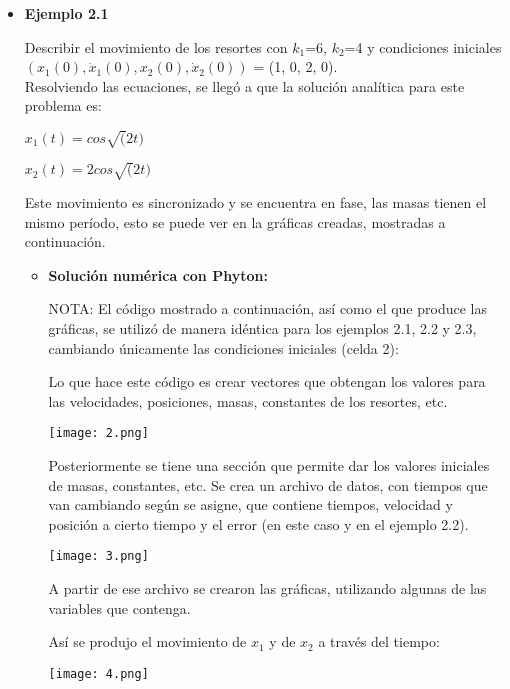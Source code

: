 \documentclass[12pt]{article}
\begin{document}
\begin{itemize}
\item \textbf{Ejemplo 2.1}

Describir el movimiento de los resortes con $k_1$=6, $k_2$=4 y condiciones iniciales $(x_1(0), \dot x_1(0), x_2(0), \dot x_2(0))$ = (1, 0, 2, 0).\\

Resolviendo las ecuaciones, se llegó a que la solución analítica para este problema es: \\

\centerline{$x_1(t) = cos\sqrt (2t)$}
\centerline{$x_2(t) = 2cos\sqrt (2t)$}

Este movimiento es sincronizado y se encuentra en fase, las masas tienen el mismo período, esto se puede ver en la gráficas creadas, mostradas a continuación. 

\begin{itemize}
\item \textbf{Solución numérica con Phyton:}

NOTA: El código mostrado a continuación, así como el que produce las gráficas, se utilizó de manera idéntica para los ejemplos 2.1, 2.2 y 2.3, cambiando únicamente las condiciones iniciales (celda 2):

Lo que hace este código es crear vectores que obtengan los valores para las velocidades, posiciones, masas, constantes de los resortes, etc.

\begin{center}
        \texttt{[image: 2.png]}
\end{center}

Posteriormente se tiene una sección que permite dar los valores iniciales de masas, constantes, etc. Se crea un archivo de datos, con tiempos que van cambiando según se asigne, que contiene tiempos, velocidad y posición a cierto tiempo y el error (en este caso y en el ejemplo 2.2). 

\begin{center}
        \texttt{[image: 3.png]}
\end{center}


A partir de ese archivo se crearon las gráficas, utilizando algunas de las variables que contenga. 

\clearpage
Así se produjo el movimiento de $x_1$ y de $x_2$ a través del tiempo:

\begin{center}
        \texttt{[image: 4.png]}
\end{center}


\end{itemize}
\end{itemize}
\end{document}
